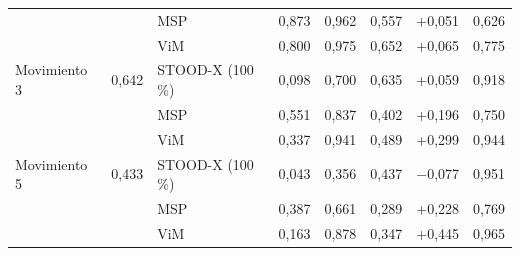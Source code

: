 {\begin{longtable}{lllccccc}
 &  & MSP & 0{,}873 & 0{,}962 & 0{,}557 & +0{,}051 & 0{,}626 \\
 &  & ViM & 0{,}800 & 0{,}975 & 0{,}652 & +0{,}065 & 0{,}775 \\
\addlinespace[2pt]
Movimiento 3 & 0{,}642 & STOOD-X (100\,\%) & 0{,}098 & 0{,}700 & 0{,}635 & +0{,}059 & 0{,}918 \\
 &  & MSP & 0{,}551 & 0{,}837 & 0{,}402 & +0{,}196 & 0{,}750 \\
 &  & ViM & 0{,}337 & 0{,}941 & 0{,}489 & +0{,}299 & 0{,}944 \\
\addlinespace[2pt]
Movimiento 5 & 0{,}433 & STOOD-X (100\,\%) & 0{,}043 & 0{,}356 & 0{,}437 & $-$0{,}077 & 0{,}951 \\
 &  & MSP & 0{,}387 & 0{,}661 & 0{,}289 & +0{,}228 & 0{,}769 \\
 &  & ViM & 0{,}163 & 0{,}878 & 0{,}347 & +0{,}445 & 0{,}965 \\
\end{longtable}
}
